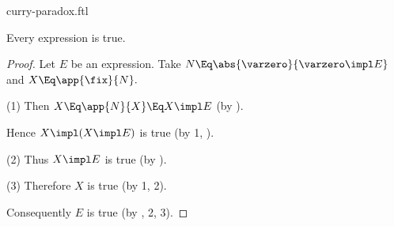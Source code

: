 \documentclass{stex}
\begin{document}
\begin{smodule}{curry-paradox.ftl}
\begin{forthel}
  \begin{theorem*}[title=Curry's Paradox,name=Curry Paradox]
    Every expression is true.
  \end{theorem*}
  \begin{proof}
    Let $E$ be an expression.
    Take $N \Eq \abs{\varzero}{\varzero \impl E}$ and $X \Eq \app{\fix}{N}.$

    (1) Then $X \Eq \app{N}{X} \Eq X \impl E$ (by ).

    Hence $X \impl (X \impl E)$ is true (by 1, ).

    (2) Thus $X \impl E$ is true (by ).

    (3) Therefore $X$ is true (by 1, 2).

    Consequently $E$ is true (by , 2, 3).
  \end{proof}
\end{forthel}

\printbibliography
{}
\end{smodule}
\end{document}
